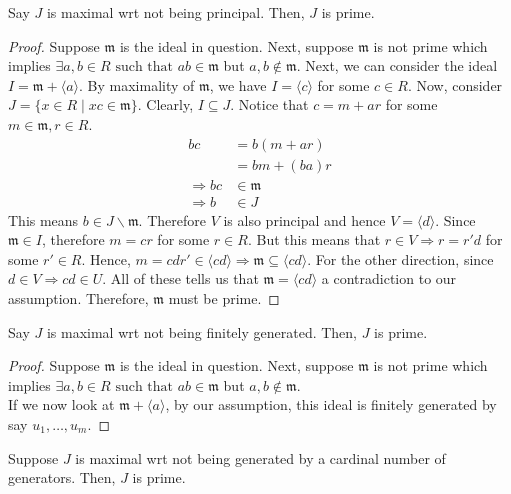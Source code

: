 \documentclass[oneside, 12pt, ]{scrbook}
\newcommand{\m}{\mathfrak{m}}
\theoremstyle{theorem}
\begin{document}
\begin{proposition}
Say $J$ is maximal wrt not being principal. Then, $J$ is prime.
\end{proposition}

\begin{proof}
Suppose $\m$ is the ideal in question. Next, suppose $\m$ is not prime which implies  $\exists a,b \in R \text{ such that } ab \in \m$ but $a,b \not \in \m$. Next, we can consider the ideal $I = \m + \langle a \rangle$. By maximality of $\m$, we have $I = \langle c \rangle$ for some $c\in R$. Now, consider $J = \{x \in R \mid xc \in \m\}$. Clearly, $I \subseteq J$. Notice that $c = m + ar$ for some $m \in \m , r \in R$. 
\begin{align*}
bc &= b(m+ar) \\
&= bm + (ba)r \\
\Rightarrow bc &\in \m \\
\Rightarrow b &\in J 
\end{align*} 
This means $b \in J \backslash \m$. Therefore $V$ is also principal and hence $V = \langle d \rangle$. Since $\m \in I$, therefore $m = cr$ for some $r\in R$. But this means that $r\in V \Rightarrow r = r'd$ for some $r' \in R$. Hence, $m = cd r' \in \langle cd \rangle \Rightarrow \m \subseteq \langle cd \rangle$. For the other direction, since $d\in V \Rightarrow cd \in U$. All of these tells us that $\m = \langle cd \rangle$ a contradiction to our assumption. Therefore, $\m$ must be prime. 
\end{proof}


\begin{proposition}
Say $J$ is maximal wrt not being finitely generated. Then, $J$ is prime.
\end{proposition}

\begin{proof}
Suppose $\m$ is the ideal in question. Next, suppose $\m$ is not prime which implies  $\exists a,b \in R \text{ such that } ab \in \m$ but $a,b \not \in \m$. \\

If we now look at $\m + \langle a \rangle$, by our assumption, this ideal is finitely generated by say $u_{1}, \hdots , u_{m}$. 
\end{proof}

\begin{exercise}
Suppose $J$ is maximal wrt not being generated by a cardinal number of generators. Then, $J$ is prime.
\end{exercise}
\end{document}
